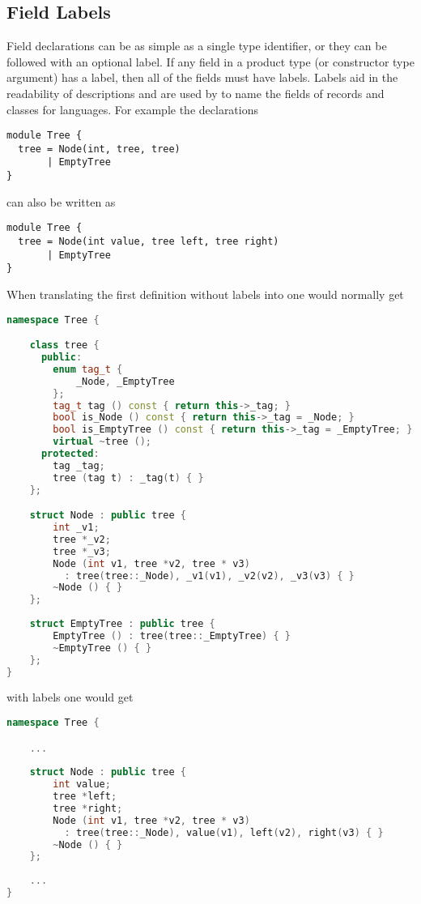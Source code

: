 \subsection{Field Labels}
Field declarations can be as simple as a single type identifier, or they can
be followed with an optional label.
If any field in a product type (or constructor type argument) has a label, then
all of the fields must have labels.
Labels aid in the readability of
descriptions and are used by \asdlgen{} to name the fields of records
and classes for languages.
For example the declarations
\begin{code}\begin{lstlisting}[language=ASDL]
module Tree {
  tree = Node(int, tree, tree)
       | EmptyTree
}
\end{lstlisting}\end{code}%
can also be written as
\begin{code}\begin{lstlisting}[language=ASDL]
module Tree {
  tree = Node(int value, tree left, tree right)
       | EmptyTree
}
\end{lstlisting}\end{code}%

When translating the first definition without labels 
into \Cplusplus{} one would normally get
\begin{code}\begin{lstlisting}[language=c++]
namespace Tree {

    class tree {
      public:
        enum tag_t {
            _Node, _EmptyTree
        };
        tag_t tag () const { return this->_tag; }
        bool is_Node () const { return this->_tag = _Node; }
        bool is_EmptyTree () const { return this->_tag = _EmptyTree; }
        virtual ~tree ();
      protected:
        tag _tag;
        tree (tag t) : _tag(t) { }
    };

    struct Node : public tree {
        int _v1;
        tree *_v2;
        tree *_v3;
        Node (int v1, tree *v2, tree * v3)
          : tree(tree::_Node), _v1(v1), _v2(v2), _v3(v3) { }
        ~Node () { }
    };
    
    struct EmptyTree : public tree {
        EmptyTree () : tree(tree::_EmptyTree) { }
        ~EmptyTree () { }
    };
}
\end{lstlisting}\end{code}%
with labels one would get
\begin{code}\begin{lstlisting}[language=c++]
namespace Tree {

    ...
    
    struct Node : public tree {
        int value;
        tree *left;
        tree *right;
        Node (int v1, tree *v2, tree * v3)
          : tree(tree::_Node), value(v1), left(v2), right(v3) { }
        ~Node () { }
    };
    
    ...
}
\end{lstlisting}\end{code}%

